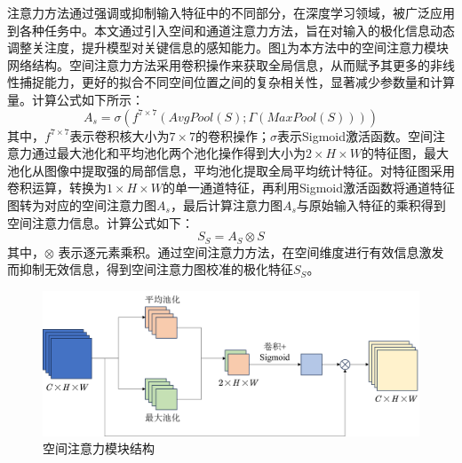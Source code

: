 


注意力方法通过强调或抑制输入特征中的不同部分，在深度学习领域，被广泛应用到各种任务中。本文通过引入空间和通道注意力方法，旨在对输入的极化信息动态调整关注度，提升模型对关键信息的感知能力。图\ref{fig:spatial}为本方法中的空间注意力模块网络结构。空间注意力方法采用卷积操作来获取全局信息，从而赋予其更多的非线性捕捉能力，更好的拟合不同空间位置之间的复杂相关性，显著减少参数量和计算量。计算公式如下所示：
\begin{equation}
    A_s=\sigma(f^{7\times 7}(AvgPool(S);\Gamma(MaxPool(S))))
\end{equation}
其中，$f^{7\times 7}$表示卷积核大小为$7\times 7$的卷积操作；$\sigma$表示Sigmoid激活函数。空间注意力通过最大池化和平均池化两个池化操作得到大小为$2\times H \times W$的特征图，最大池化从图像中提取强的局部信息，平均池化提取全局平均统计特征。对特征图采用卷积运算，转换为$1\times H\times W$的单一通道特征，再利用Sigmoid激活函数将通道特征图转为对应的空间注意力图$A_s$，最后计算注意力图$A_s$与原始输入特征的乘积得到空间注意力信息。计算公式如下：
\begin{equation}
    S_S=A_S \otimes S
\end{equation}
其中，$\otimes$ 表示逐元素乘积。通过空间注意力方法，在空间维度进行有效信息激发而抑制无效信息，得到空间注意力图校准的极化特征$S_S$。

\begin{figure}[ht!]
    \centering
    \includegraphics[width=14cm]{pic/chapter3/Spatial.png}
    \caption{空间注意力模块结构}
    \label{fig:spatial}
\end{figure}

